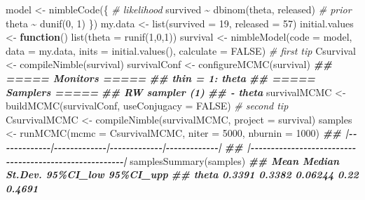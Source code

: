\documentclass[
  12pt,
]{krantz}
\newenvironment{Shaded}{\begin{snugshade}}{\end{snugshade}}
\newcommand{\AttributeTok}[1]{\textcolor[rgb]{0.77,0.63,0.00}{#1}}
\newcommand{\CommentTok}[1]{\textcolor[rgb]{0.56,0.35,0.01}{\textit{#1}}}
\newcommand{\ConstantTok}[1]{\textcolor[rgb]{0.00,0.00,0.00}{#1}}
\newcommand{\ControlFlowTok}[1]{\textcolor[rgb]{0.13,0.29,0.53}{\textbf{#1}}}
\newcommand{\DecValTok}[1]{\textcolor[rgb]{0.00,0.00,0.81}{#1}}
\newcommand{\DocumentationTok}[1]{\textcolor[rgb]{0.56,0.35,0.01}{\textbf{\textit{#1}}}}
\newcommand{\FunctionTok}[1]{\textcolor[rgb]{0.00,0.00,0.00}{#1}}
\newcommand{\NormalTok}[1]{#1}
\newcommand{\OtherTok}[1]{\textcolor[rgb]{0.56,0.35,0.01}{#1}}
\newcommand{\SpecialCharTok}[1]{\textcolor[rgb]{0.00,0.00,0.00}{#1}}
\begin{document}
\begin{Shaded}
\begin{Highlighting}[]
\NormalTok{model }\OtherTok{\textless{}{-}} \FunctionTok{nimbleCode}\NormalTok{(\{}
  \CommentTok{\# likelihood}
\NormalTok{  survived }\SpecialCharTok{\textasciitilde{}} \FunctionTok{dbinom}\NormalTok{(theta, released)}
  \CommentTok{\# prior}
\NormalTok{  theta }\SpecialCharTok{\textasciitilde{}} \FunctionTok{dunif}\NormalTok{(}\DecValTok{0}\NormalTok{, }\DecValTok{1}\NormalTok{)}
\NormalTok{\})}
\NormalTok{my.data }\OtherTok{\textless{}{-}} \FunctionTok{list}\NormalTok{(}\AttributeTok{survived =} \DecValTok{19}\NormalTok{, }\AttributeTok{released =} \DecValTok{57}\NormalTok{)}
\NormalTok{initial.values }\OtherTok{\textless{}{-}} \ControlFlowTok{function}\NormalTok{() }\FunctionTok{list}\NormalTok{(}\AttributeTok{theta =} \FunctionTok{runif}\NormalTok{(}\DecValTok{1}\NormalTok{,}\DecValTok{0}\NormalTok{,}\DecValTok{1}\NormalTok{))}
\NormalTok{survival }\OtherTok{\textless{}{-}} \FunctionTok{nimbleModel}\NormalTok{(}\AttributeTok{code =}\NormalTok{ model, }
                        \AttributeTok{data =}\NormalTok{ my.data, }
                        \AttributeTok{inits =} \FunctionTok{initial.values}\NormalTok{(),}
                        \AttributeTok{calculate =} \ConstantTok{FALSE}\NormalTok{) }\CommentTok{\# first tip}
\NormalTok{Csurvival }\OtherTok{\textless{}{-}} \FunctionTok{compileNimble}\NormalTok{(survival)}
\NormalTok{survivalConf }\OtherTok{\textless{}{-}} \FunctionTok{configureMCMC}\NormalTok{(survival)}
\DocumentationTok{\#\# ===== Monitors =====}
\DocumentationTok{\#\# thin = 1: theta}
\DocumentationTok{\#\# ===== Samplers =====}
\DocumentationTok{\#\# RW sampler (1)}
\DocumentationTok{\#\#   {-} theta}
\NormalTok{survivalMCMC }\OtherTok{\textless{}{-}} \FunctionTok{buildMCMC}\NormalTok{(survivalConf, }\AttributeTok{useConjugacy =} \ConstantTok{FALSE}\NormalTok{) }\CommentTok{\# second tip}
\NormalTok{CsurvivalMCMC }\OtherTok{\textless{}{-}} \FunctionTok{compileNimble}\NormalTok{(survivalMCMC, }
                               \AttributeTok{project =}\NormalTok{ survival)}
\NormalTok{samples }\OtherTok{\textless{}{-}} \FunctionTok{runMCMC}\NormalTok{(}\AttributeTok{mcmc =}\NormalTok{ CsurvivalMCMC, }
                   \AttributeTok{niter =} \DecValTok{5000}\NormalTok{, }
                   \AttributeTok{nburnin =} \DecValTok{1000}\NormalTok{)}
\DocumentationTok{\#\# |{-}{-}{-}{-}{-}{-}{-}{-}{-}{-}{-}{-}{-}|{-}{-}{-}{-}{-}{-}{-}{-}{-}{-}{-}{-}{-}|{-}{-}{-}{-}{-}{-}{-}{-}{-}{-}{-}{-}{-}|{-}{-}{-}{-}{-}{-}{-}{-}{-}{-}{-}{-}{-}|}
\DocumentationTok{\#\# |{-}{-}{-}{-}{-}{-}{-}{-}{-}{-}{-}{-}{-}{-}{-}{-}{-}{-}{-}{-}{-}{-}{-}{-}{-}{-}{-}{-}{-}{-}{-}{-}{-}{-}{-}{-}{-}{-}{-}{-}{-}{-}{-}{-}{-}{-}{-}{-}{-}{-}{-}{-}{-}{-}{-}|}
\FunctionTok{samplesSummary}\NormalTok{(samples)}
\DocumentationTok{\#\#         Mean Median St.Dev. 95\%CI\_low 95\%CI\_upp}
\DocumentationTok{\#\# theta 0.3391 0.3382 0.06244      0.22    0.4691}
\end{Highlighting}
\end{Shaded}
\end{document}
